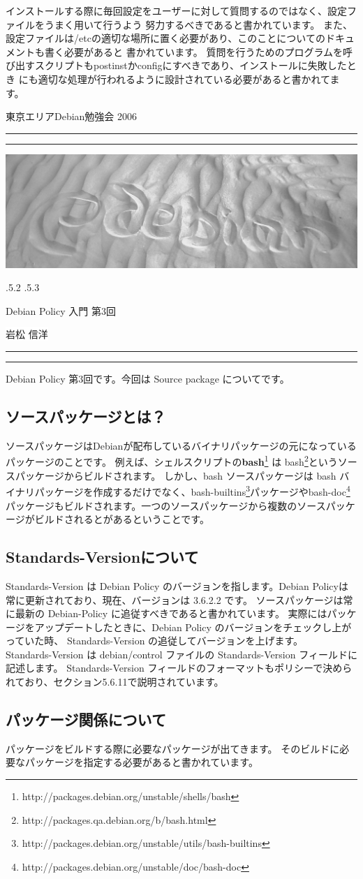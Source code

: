 \documentclass[mingoth,a4paper]{jsarticle}
\makeatletter
\renewcommand{\section}{\@startsection{section}{1}{\z@}%
    {\Cvs \@plus.5\Cdp \@minus.2\Cdp}%
    {.5\Cvs \@plus.3\Cdp}%
    {\normalfont\Huge\headfont\raggedright\centering}} %
\newcommand{\dancersection}[2]{%
\newpage
東京エリアDebian勉強会 2006
\hrule
\vspace{0.5mm}
\hrule
\hfill{}\includegraphics[width=16cm]{image2006-natsu/guruguru-sand-light.png}\\
\vspace{-5cm}
\begin{center}
\section{#1}
\end{center}
\hfill{}\colorbox{white}{#2}\hspace{3cm}\space\\
\vspace{1cm}
\hrule
\vspace{0.5mm}
\hrule
\vspace{1cm}
}
\makeatother
\begin{document}
インストールする際に毎回設定をユーザーに対して質問するのではなく、設定ファイルをうまく用いて行うよう
努力するべきであると書かれています。
また、設定ファイルは/etcの適切な場所に置く必要があり、このことについてのドキュメントも書く必要があると
書かれています。
質問を行うためのプログラムを呼び出すスクリプトもpostinstかconfigにすべきであり、インストールに失敗したとき
にも適切な処理が行われるように設計されている必要があると書かれてます。


\dancersection{Debian Policy 入門 第3回}{岩松 信洋}
\label{sec:policy2}
Debian Policy 第3回です。今回は Source package についてです。
\subsection{ソースパッケージとは？}
ソースパッケージはDebianが配布しているバイナリパッケージの元になっているパッケージのことです。
例えば、シェルスクリプトの{\bf bash}\footnote{http://packages.debian.org/unstable/shells/bash} は bash\footnote{http://packages.qa.debian.org/b/bash.html}というソースパッケージからビルドされます。
しかし、bash ソースパッケージは bash バイナリパッケージを作成するだけでなく、bash-builtins\footnote{http://packages.debian.org/unstable/utils/bash-builtins}パッケージやbash-doc\footnote{http://packages.debian.org/unstable/doc/bash-doc}パッケージもビルドされます。一つのソースパッケージから複数のソースパッケージがビルドされるとがあるということです。

\subsection{Standards-Versionについて}
Standards-Version は Debian Policy のバージョンを指します。Debian Policyは常に更新されており、現在、バージョンは 3.6.2.2 です。
ソースパッケージは常に最新の Debian-Policy に追従すべきであると書かれています。
実際にはパッケージをアップデートしたときに、Debian Policy のバージョンをチェックし上がっていた時、 Standards-Version の追従してバージョンを上げます。
\\
Standards-Version は debian/control ファイルの Standards-Version フィールドに記述します。
Standards-Version フィールドのフォーマットもポリシーで決められており、セクション5.6.11で説明されています。

\subsection{パッケージ関係について}
パッケージをビルドする際に必要なパッケージが出てきます。
そのビルドに必要なパッケージを指定する必要があると書かれています。
\end{document}

